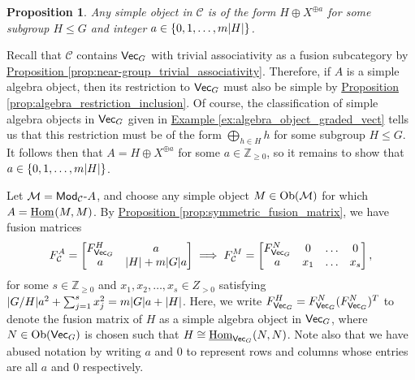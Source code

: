\documentclass[12pt, reqno]{amsart}
\numberwithin{equation}{section}
\theoremstyle{plainspace}
\newtheorem{proposition}[theorem]{Proposition}
\theoremstyle{definitionspace}
\theoremstyle{remarkspace}
\renewenvironment{proof}{{\noindent\textbf{Proof.}}}{\null\hfill\qedsymbol}
\DeclarePairedDelimiter{\abs}{\lvert}{\rvert}
\newcommand{\mathcat}[1]{\mathcal{#1}}
\newcommand{\Ob}{\textup{Ob}}
\newcommand{\IntHom}[2][]{
	\ifthenelse{\equal{#2}{}}
		{\underline{\textup{Hom}}_{#1}}
		{\underline{\textup{Hom}}_{#1}\!\left(#2\right)}
}
\newcommand{\textcat}[1]{\textup{\textsf{#1}}}
\newcommand{\rmodcat}[2][]{\textcat{Mod}_{#1}\textcat{-}#2}
\begin{document}
\begin{proposition}\label{prop:near-group_algebra_candidates}
Any simple object in $\mathcat{C}$ is of the form $H \oplus X^{\oplus a}$ for some subgroup $H \leq G$ and integer $a \in \{0, 1, \dots, m\abs{H}\}$.
\end{proposition}
\leavevmode\newline
\begin{proof}
\noindent Recall that $\mathcat{C}$ contains $\textcat{Vec}_G$ with trivial associativity as a fusion subcategory by \hyperref[prop:near-group_trivial_associativity]{Proposition \ref*{prop:near-group_trivial_associativity}}. Therefore, if $A$ is a simple algebra object, then its restriction to $\textcat{Vec}_G$ must also be simple by \hyperref[prop:algebra_restriction_inclusion]{Proposition \ref*{prop:algebra_restriction_inclusion}}. Of course, the classification of simple algebra objects in $\textcat{Vec}_G$ given in \hyperref[ex:algebra_object_graded_vect]{Example \ref*{ex:algebra_object_graded_vect}} tells us that this restriction must be of the form $\bigoplus_{h \in H}{h}$ for some subgroup $H \leq G$. It follows then that $A = H \oplus X^{\oplus a}$ for some $a \in \mathbb{Z}_{\geq 0}$, so it remains to show that $a \in \{0, 1, \dots, m\abs{H}\}$.
\newline

\noindent Let $\mathcat{M} = \rmodcat[\mathcat{C}]{A}$, and choose any simple object $M \in \Ob(\mathcat{M})$ for which $A = \IntHom{M, M}$. By \hyperref[prop:symmetric_fusion_matrix]{Proposition \ref*{prop:symmetric_fusion_matrix}}, we have fusion matrices
\begin{align*}
\begin{split}
F_{\mathcat{C}}^A = \begin{bmatrix}
F_{\textcat{Vec}_G}^H & a \\
a & \abs{H} + m\abs{G}a
\end{bmatrix} \implies F_{\mathcat{C}}^M = \begin{bmatrix}
F_{\textcat{Vec}_G}^N & 0 & \dots & 0 \\
a & x_1 & \dots & x_s
\end{bmatrix},
\end{split}
\end{align*}
\noindent for some $s \in \mathbb{Z}_{\geq 0}$ and $x_1, x_2, \dots, x_s \in Z_{>0}$ satisfying $\abs{G/H}a^2 + \sum_{j=1}^{s}{x_j^2} = m\abs{G}a + \abs{H}$. Here, we write $F_{\textcat{Vec}_G}^H = F_{\textcat{Vec}_G}^N(F_{\textcat{Vec}_G}^N)^T$ to denote the fusion matrix of $H$ as a simple algebra object in $\textcat{Vec}_G$, where $N \in \Ob(\textcat{Vec}_G)$ is chosen such that $H \cong \IntHom[\textcat{Vec}_G]{N, N}$. Note also that we have abused notation by writing $a$ and $0$ to represent rows and columns whose entries are all $a$ and $0$ respectively.
\newline


\end{proof}
\end{document}
